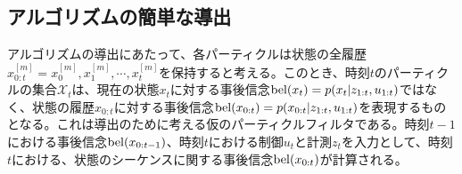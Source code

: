 \documentclass[dvipdfmx,a4paper]{jsarticle}
\begin{document}
\subsection{アルゴリズムの簡単な導出}
アルゴリズムの導出にあたって、各パーティクルは状態の全履歴$x_{0 : t}^{[m]} = x_0^{[m]}, x_1^{[m]}, \cdots, x_t^{[m]}$を保持すると考える。このとき、時刻$t$のパーティクルの集合$\mathcal{X}_t$は、現在の状態$x_t$に対する事後信念$\operatorname{bel}(x_t) = p(x_t | z_{1 : t}, u_{1 : t})$ではなく、状態の履歴$x_{0 : t}$に対する事後信念$\operatorname{bel}(x_{0 : t}) = p(x_{0 : t} | z_{1 : t}, u_{1 : t})$を表現するものとなる。これは導出のために考える仮のパーティクルフィルタである。時刻$t - 1$における事後信念$\operatorname{bel}(x_{0 : t - 1})$、時刻$t$における制御$u_t$と計測$z_t$を入力として、時刻$t$における、状態のシーケンスに関する事後信念$\operatorname{bel}(x_{0 : t})$が計算される。\newline
\end{document}
